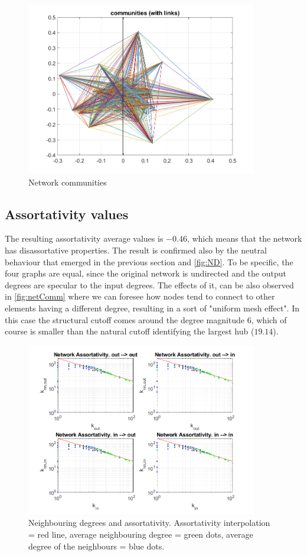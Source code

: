 \documentclass[12pt,a4paper]{article}
\begin{document}
\begin{figure}
\centering
  \includegraphics[width = 0.9\textwidth]{img/NetworkCommunities}
\caption{Network communities}
\label{fig:netComm}
\end{figure}

\subsection*{Assortativity values}
The resulting assortativity average values is $-0.46$, which means that the network has disassortative properties. The result is confirmed also by the neutral behaviour that emerged in the previous section and \autoref{fig:ND}. To be specific, the four graphs are equal, since the original network is undirected and the output degrees are specular to the input degrees. The effects of it, can be also observed in \autoref{fig:netComm} where we can foresee how nodes tend to connect to other elements having a different degree, resulting in a sort of "uniform mesh effect". In this case the structural cutoff comes around the degree magnitude $6$, which of course is smaller than the natural cutoff identifying the largest hub ($19.14$).

\begin{figure}
\centering
  \includegraphics[width = 0.9\textwidth]{img/Assortativity}
\caption{Neighbouring degrees and assortativity. Assortativity interpolation = red line, average neighbouring degree = green dots, average degree of the neighbours = blue dots.}
\label{fig:ND}
\end{figure}
\end{document}
